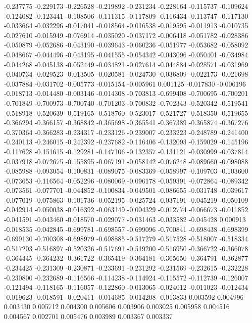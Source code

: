 -0.237775
-0.229173
-0.226528
-0.219892
-0.231234
-0.228164
-0.115737
-0.109624
-0.124082
-0.123441
-0.108506
-0.111315
-0.117809
-0.116434
-0.113747
-0.117130
-0.033664
-0.032296
-0.017041
-0.018564
-0.016538
-0.019595
-0.011913
-0.010735
-0.027610
-0.015949
-0.076914
-0.035020
-0.037172
-0.006418
-0.051782
-0.028386
-0.050879
-0.052686
-0.043190
-0.039643
-0.060236
-0.051977
-0.053682
-0.058092
-0.048667
-0.044496
-0.043195
-0.041555
-0.054342
-0.043096
-0.050401
-0.034984
-0.044268
-0.045138
-0.052449
-0.034821
-0.027614
-0.044884
-0.028571
-0.031969
-0.040734
-0.029523
-0.013505
-0.020581
-0.024730
-0.036809
-0.022173
-0.021698
-0.037884
-0.031702
-0.005773
-0.015154
-0.005961
0.001125
-0.017830
-0.006196
-0.018713
-0.014480
-0.003146
-0.014308
-0.703813
-0.699408
-0.700695
-0.700201
-0.701849
-0.700973
-0.700740
-0.701203
-0.700832
-0.702343
-0.520342
-0.519541
-0.518918
-0.520639
-0.519165
-0.518760
-0.523017
-0.521727
-0.518350
-0.519655
-0.366294
-0.366157
-0.368842
-0.365698
-0.365541
-0.367389
-0.365874
-0.367276
-0.370364
-0.366283
-0.234317
-0.233126
-0.239007
-0.233223
-0.248789
-0.241400
-0.240113
-0.246015
-0.242392
-0.237682
-0.116406
-0.132093
-0.159029
-0.145196
-0.117628
-0.151615
-0.129281
-0.147106
-0.132357
-0.131121
-0.030999
-0.037814
-0.037918
-0.072675
-0.155895
-0.067191
-0.058142
-0.076248
-0.089660
-0.098088
-0.085988
-0.093054
-0.100831
-0.089075
-0.083369
-0.058997
-0.109703
-0.103600
-0.073653
-0.116564
-0.052296
-0.080069
-0.096178
-0.059391
-0.072864
-0.089342
-0.073561
-0.077701
-0.044852
-0.100834
-0.049501
-0.086655
-0.031748
-0.039617
-0.077019
-0.075863
-0.101736
-0.052195
-0.025724
-0.037191
-0.045219
-0.050109
-0.042914
-0.050038
-0.016392
-0.063149
-0.004329
-0.012774
-0.066673
-0.011852
-0.041591
-0.043460
-0.018570
-0.029077
-0.031463
-0.033582
-0.045428
0.000913
-0.018535
-0.042845
-0.699781
-0.698557
-0.699096
-0.700841
-0.698438
-0.698399
-0.699130
-0.700308
-0.698979
-0.698885
-0.517279
-0.517528
-0.518007
-0.518334
-0.517203
-0.516897
-0.520326
-0.517691
-0.519200
-0.516950
-0.366722
-0.366078
-0.364445
-0.364232
-0.361722
-0.365419
-0.364181
-0.365650
-0.364791
-0.362877
-0.234425
-0.231309
-0.230871
-0.233691
-0.231292
-0.231569
-0.232615
-0.232228
-0.230800
-0.232689
-0.116566
-0.114238
-0.114924
-0.115572
-0.112739
-0.126007
-0.121494
-0.118165
-0.116057
-0.122860
-0.013065
-0.024012
-0.011023
-0.012434
-0.019623
-0.018591
-0.020411
-0.014685
-0.014208
-0.013833
0.003592
0.004996
0.003430
0.005712
0.004300
0.005606
0.003906
0.003025
0.005958
0.004516
0.004567
0.002701
0.005476
0.003989
0.003367
0.003337
